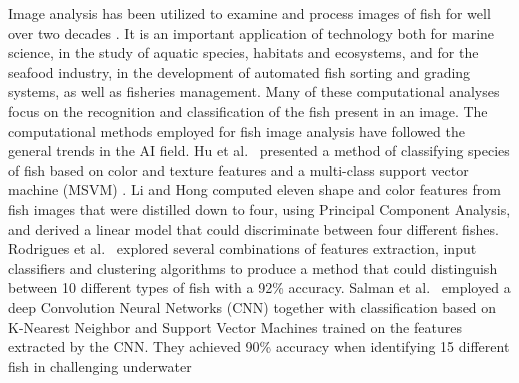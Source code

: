 \documentclass[conference]{IEEEtran}
\begin{document}
Image analysis has been utilized to examine and process images of fish
for well over two decades \cite{Zion2000InvivoFS,Saberioon2017ApplicationOM}. It is an important
application of technology both for marine science, in the study of aquatic
species, habitats and ecosystems, and for the seafood industry, in the
development of automated fish sorting and grading systems, as well as
fisheries management. Many of these computational analyses focus on
the recognition and classification
of the fish present in an image.  The computational methods employed for
fish image analysis have followed the general trends in the AI field.
Hu et al.~\cite{HuJing2012Fscb} presented a method of classifying species
of fish based on color and texture features and a multi-class support
vector machine (MSVM) \cite{Vapnik1999AOS}.
Li and Hong \cite{Li2014IdentificationOF} computed eleven shape and color
features from fish images that were distilled down to four, using Principal
Component Analysis, and derived a linear model
that could discriminate between four different fishes.
Rodrigues et al.~\cite{RodriguesMarcoT.A2015Ecda} explored several
combinations of features extraction, input classifiers and clustering
algorithms to produce a method that could distinguish between 10 different
types of fish with a 92\% accuracy.
Salman et al.~\cite{Salman2016FishSC} employed a deep Convolution Neural
Networks (CNN) \cite{LeCun2004LMG} together with classification based on
K-Nearest Neighbor and Support Vector Machines trained on the features
extracted by the CNN. They achieved 90\%
accuracy when identifying 15 different fish in challenging underwater
\end{document}
